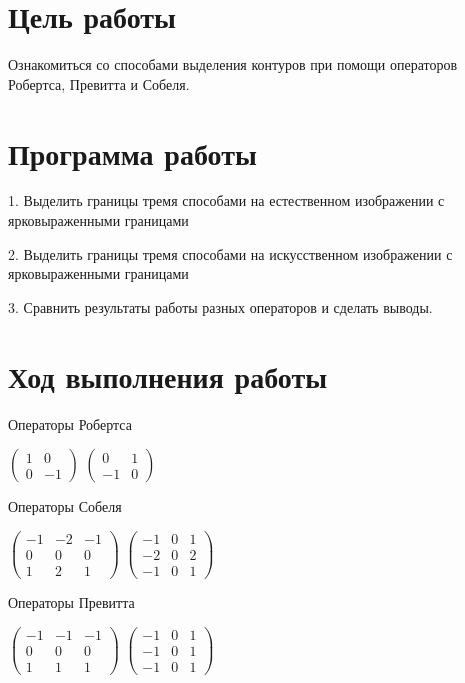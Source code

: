 
\usepackage{amsmath}







\section{Цель работы}
Ознакомиться со способами выделения контуров при помощи операторов Робертса, Превитта и Собеля.


\section{Программа работы}
1. Выделить границы тремя способами на естественном изображении с ярковыраженными границами

2. Выделить границы тремя способами на искусственном изображении с ярковыраженными границами 

3. Сравнить результаты работы разных операторов и сделать выводы.


\section{Ход выполнения работы}

Операторы Робертса 

$\begin{pmatrix}
	1 & 0\\ 
	0 & -1
\end{pmatrix}$ 
$\begin{pmatrix}
	0 & 1\\ 
	-1 & 0
\end{pmatrix}$ 


Операторы Собеля 

$\begin{pmatrix}
	-1 & -2 & -1\\ 
	0 & 0 & 0 \\
	1 & 2 & 1
\end{pmatrix}$ 
$\begin{pmatrix}
	-1 & 0 & 1\\ 
	-2 & 0 & 2 \\
	-1 & 0 & 1
\end{pmatrix}$ 


Операторы Превитта 

$\begin{pmatrix}
	-1 & -1 & -1\\ 
	0 & 0 & 0 \\
	1 & 1 & 1
\end{pmatrix}$ 
$\begin{pmatrix}
	-1 & 0 & 1\\ 
	-1 & 0 & 1 \\
	-1 & 0 & 1
\end{pmatrix}$ 

